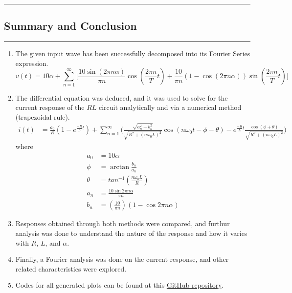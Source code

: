 \newpage
{\color{gray}\hrule}
\begin{center}
\section{Summary and Conclusion}
\bigskip
\end{center}
{\color{gray}\hrule}
\vspace{0.5cm}
\begin{enumerate}
    \item The given input wave has been successfully decomposed into its Fourier Series expression.
\begin{equation*}
v(t) = 10\alpha + \sum_{n=1}^{\infty} \Bigg[ \frac{10 \sin (2 \pi n \alpha)}{\pi n} \cos\left(\frac{2\pi n}{T} t \right) + \frac{10}{\pi n} (1 - \cos (2 \pi n \alpha)) \sin\left(\frac{2\pi n}{T} t \right) \Bigg]
\end{equation*}
    \item The differential equation was deduced, and it was used to solve for the current response of the $RL$ circuit analytically and via a numerical method (trapezoidal rule).
\begin{align*}
i(t) &= \frac{a_0}{R} \left(1-e^{\frac{-R}{L}t} \right) + \sum_{n=1}^{\infty} \Bigg( \frac{\sqrt{a_n^2+b_n^2}}{\sqrt{R^2+(n\omega_0L)^2}} \cos(n\omega_0t-\phi-\theta) - e^{\frac{-R}{L}t} \frac{\cos(\phi+\theta)}{\sqrt{R^2+(n\omega_0L)^2}} \Bigg)
\end{align*}
where
\begin{align*}
a_0&=10\alpha\\
\phi &= \arctan{\frac{b_n}{a_n}}\\
\theta&=tan^{-1}\left(\frac{n\omega_0L}{R}\right)\\
a_n&=\frac{10 \sin 2 \pi n \alpha}{\pi n} \\
b_n&=\left( \frac{10}{ \pi n} \right) (1 - \cos 2 \pi n \alpha)
\end{align*}
    \item Responses obtained through both methods were compared, and furthur analysis was done to understand the nature of the response and how it varies with $R$, $L$, and $\alpha$.
    \item Finally, a Fourier analysis was done on the current response, and other related characteristics were explored.
    \item Codes for all generated plots can be found at this \href{https://github.com/mandara-h/EE1060}{GitHub repository}.
\end{enumerate}
